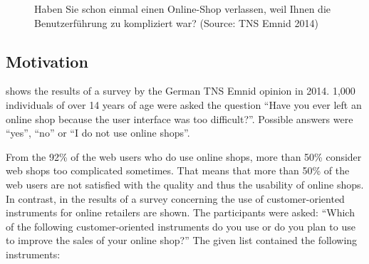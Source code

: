 \documentclass[output=paper]{langsci/langscibook}
\begin{document}
  
\begin{figure}[t]
 

 \caption{Haben Sie schon einmal einen Online-Shop verlassen, weil Ihnen die Benutzerführung zu kompliziert war? (Source: TNS Emnid 2014)}
 \label{roesener:fig:1}
\end{figure} 
 


\subsection{Motivation}

 shows the results of a survey by the German TNS Emnid opinion in 2014. 1,000 individuals of over 14 years of age were asked the question ``Have you ever left an online shop because the user interface was too difficult?''. Possible answers were ``yes'', ``no'' or ``I do not use online shops''.


From the 92\% of the web users who do use online shops, more than 50\% consider web shops too complicated sometimes. That means that more than 50\% of the web users are not satisfied with the quality and thus the usability of online shops. In contrast, in  the results of a survey concerning the use of customer-oriented instruments for online retailers are shown. The participants were asked: ``Which of the following customer-oriented instruments do you use or do you plan to use to improve the sales of your online shop?'' The given list contained the following instruments:
\end{document}
